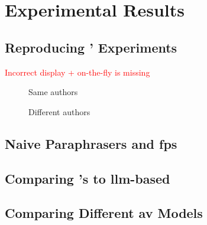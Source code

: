 \chapter{Experimental Results}
\label{chap:experimental_results}

\section{Reproducing \citet{koppel_determining_2014}' Experiments}

\textcolor{red}{Incorrect display + on-the-fly is missing}
\begin{figure}[htbp]
  \centering
  \begin{subfigure}[b]{0.45\textwidth}
    \centering
    
    \caption{\dataBlog{}}
    \label{fig:blog_same_author}
  \end{subfigure}
  \hfill
  \begin{subfigure}[b]{0.45\textwidth}
    \centering
    
    \caption{\dataStudent{}}
    \label{fig:student_essays_same_author}
  \end{subfigure}
  \caption{Same authors}
  \label{fig:same_authors}
\end{figure}


\begin{figure}[htbp]
  \centering
  \begin{subfigure}[b]{0.45\textwidth}
    \centering
    
    \caption{\dataBlog{}}
    \label{fig:blog_different_author}
  \end{subfigure}
  \hfill
  \begin{subfigure}[b]{0.45\textwidth}
    \centering
    
    \caption{\dataStudent{}}
    \label{fig:student_essays_different_author}
  \end{subfigure}
  \caption{Different authors}
  \label{fig:different_authors}
\end{figure}







\section{Naive Paraphrasers and \acp{fp}}

\section{Comparing \citet{koppel_determining_2014}'s to \ac{llm}-based \imps{}}

\section{Comparing Different \ac{av} Models}